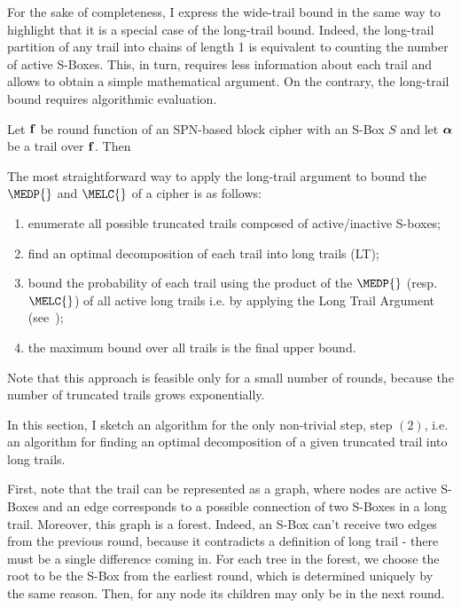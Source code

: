 For the sake of completeness, I express the wide-trail bound in the same way to highlight that it is a special case of the long-trail bound. Indeed, the long-trail partition of any trail into chains of length 1 is equivalent to counting the number of active S-Boxes. This, in turn, requires less information about each trail and allows to obtain a simple mathematical argument. On the contrary, the long-trail bound requires algorithmic evaluation.

\begin{proposition}
Let $\mathbf{f}$ be round function of an SPN-based block cipher with an S-Box $S$ and let $\boldsymbol{\alpha}$ be a trail over $\mathbf{f}$. Then
\end{proposition}




The most straightforward way to apply the long-trail argument to bound the $\MEDP{}$ and $\MELC{}$ of a cipher is as follows:
\begin{enumerate}
    \item enumerate all possible truncated trails composed of active/inactive S-boxes;
    \item find an optimal decomposition of each trail into long trails (LT);
    \item bound the probability of each trail using the product of the $\MEDP{}$ (resp. $\MELC{}$) of all active long trails i.e. by applying the Long Trail Argument (see~);
    \item the maximum bound over all trails is the final upper bound.
\end{enumerate}


Note that this approach is feasible only for a small number of rounds, because the number of truncated trails grows exponentially.

In this section, I sketch an algorithm for the only non-trivial step, step $(2)$, i.e. an algorithm for finding an optimal decomposition of a given truncated trail into long trails. 

First, note that the trail can be represented as a graph, where nodes are active S-Boxes and an edge corresponds to a possible connection of two S-Boxes in a long trail. Moreover, this graph is a forest. Indeed, an S-Box can't receive two edges from the previous round, because it contradicts a definition of long trail - there must be a single difference coming in. For each tree in the forest, we choose the root to be the S-Box from the earliest round, which is determined uniquely by the same reason. Then, for any node its children may only be in the next round.

